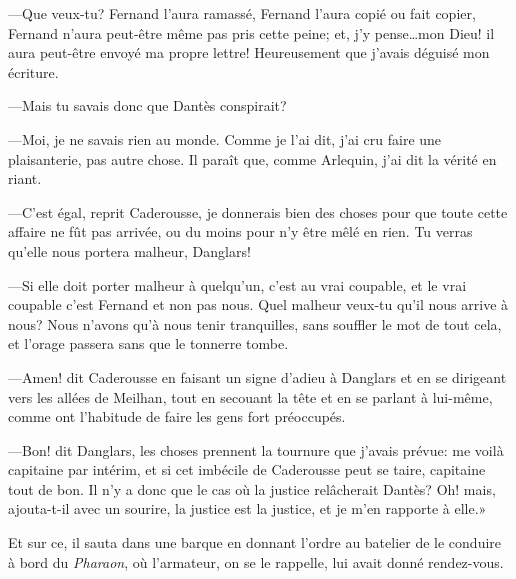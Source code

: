 —Que veux-tu? Fernand l'aura ramassé, Fernand l'aura copié ou fait copier, Fernand n'aura peut-être même pas pris cette peine; et, j'y pense\dots mon Dieu! il aura peut-être envoyé ma propre lettre! Heureusement que j'avais déguisé mon écriture.

—Mais tu savais donc que Dantès conspirait?

—Moi, je ne savais rien au monde. Comme je l'ai dit, j'ai cru faire une plaisanterie, pas autre chose. Il paraît que, comme Arlequin, j'ai dit la vérité en riant.

—C'est égal, reprit Caderousse, je donnerais bien des choses pour que toute cette affaire ne fût pas arrivée, ou du moins pour n'y être mêlé en rien. Tu verras qu'elle nous portera malheur, Danglars!

—Si elle doit porter malheur à quelqu'un, c'est au vrai coupable, et le vrai coupable c'est Fernand et non pas nous. Quel malheur veux-tu qu'il nous arrive à nous? Nous n'avons qu'à nous tenir tranquilles, sans souffler le mot de tout cela, et l'orage passera sans que le tonnerre tombe.

—Amen! dit Caderousse en faisant un signe d'adieu à Danglars et en se dirigeant vers les allées de Meilhan, tout en secouant la tête et en se parlant à lui-même, comme ont l'habitude de faire les gens fort préoccupés.

—Bon! dit Danglars, les choses prennent la tournure que j'avais prévue: me voilà capitaine par intérim, et si cet imbécile de Caderousse peut se taire, capitaine tout de bon. Il n'y a donc que le cas où la justice relâcherait Dantès? Oh! mais, ajouta-t-il avec un sourire, la justice est la justice, et je m'en rapporte à elle.»

Et sur ce, il sauta dans une barque en donnant l'ordre au batelier de le conduire à bord du \textit{Pharaon}, où l'armateur, on se le rappelle, lui avait donné rendez-vous.



